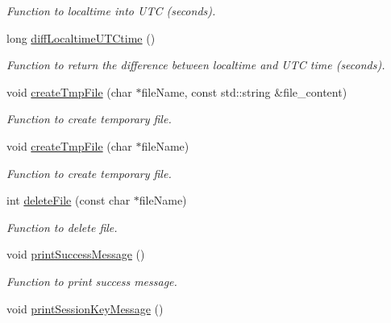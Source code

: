 \begin{DoxyCompactItemize}
\begin{DoxyCompactList}\small\item\em Function to localtime into UTC (seconds). \item\end{DoxyCompactList}\item 
long \hyperlink{namespacevishnu_a34f4596f7c86c2f9bd6b6bd49be69e6f}{diffLocaltimeUTCtime} ()
\begin{DoxyCompactList}\small\item\em Function to return the difference between localtime and UTC time (seconds). \item\end{DoxyCompactList}\item 
void \hyperlink{namespacevishnu_a33f3fca5bc294663e2863c1abc1da5c8}{createTmpFile} (char $\ast$fileName, const std::string \&file\_\-content)
\begin{DoxyCompactList}\small\item\em Function to create temporary file. \item\end{DoxyCompactList}\item 
void \hyperlink{namespacevishnu_a18002572e5b0039069544475365f335d}{createTmpFile} (char $\ast$fileName)
\begin{DoxyCompactList}\small\item\em Function to create temporary file. \item\end{DoxyCompactList}\item 
int \hyperlink{namespacevishnu_adccbbcf352ca9471d210e9d801c73e2d}{deleteFile} (const char $\ast$fileName)
\begin{DoxyCompactList}\small\item\em Function to delete file. \item\end{DoxyCompactList}\item 
\hypertarget{namespacevishnu_ab0ea8ccb86c430f6a602374c82f66d2e}{
void \hyperlink{namespacevishnu_ab0ea8ccb86c430f6a602374c82f66d2e}{printSuccessMessage} ()}
\label{namespacevishnu_ab0ea8ccb86c430f6a602374c82f66d2e}

\begin{DoxyCompactList}\small\item\em Function to print success message. \item\end{DoxyCompactList}\item 
\hypertarget{namespacevishnu_af872d4641cf320df3d2c2102dccbd18e}{
void \hyperlink{namespacevishnu_af872d4641cf320df3d2c2102dccbd18e}{printSessionKeyMessage} ()}
\label{namespacevishnu_af872d4641cf320df3d2c2102dccbd18e}


\end{DoxyCompactItemize}
